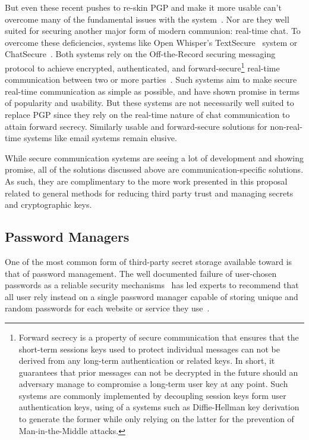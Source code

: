 But even these recent pushes to re-skin PGP and make it more usable
can't overcome many of the fundamental issues with the
system~\cite{green-pgp}. Nor are they well suited for securing another
major form of modern communion: real-time chat. To overcome these
deficiencies, systems like Open Whisper's
TextSecure~\cite{openwhisper} system or
ChatSecure~\cite{chatsecure}. Both systems rely on the Off-the-Record
securing messaging protocol to achieve encrypted, authenticated, and
forward-secure\footnote{Forward secrecy is a property of secure
  communication that ensures that the short-term sessions keys used to
  protect individual messages can not be derived from any long-term
  authentication or related keys. In short, it guarantees that prior
  messages can not be decrypted in the future should an adversary
  manage to compromise a long-term user key at any point. Such systems
  are commonly implemented by decoupling session keys form user
  authentication keys, using of a systems such as Diffie-Hellman key
  derivation~\cite{diffie1976} to generate the former while only
  relying on the latter for the prevention of Man-in-the-Middle
  attacks.} real-time communication between two or more
parties~\cite{otr-v3, borisov2004, goldberg2009}. Such systems aim to
make secure real-time communication as simple as possible, and have
shown promise in terms of popularity and usability. But these systems
are not necessarily well suited to replace PGP since they rely on the
real-time nature of chat communication to attain forward
secrecy. Similarly usable and forward-secure solutions for
non-real-time systems like email systems remain elusive.

While secure communication systems are seeing a lot of development and
showing promise, all of the solutions discussed above are
communication-specific solutions. As such, they are complimentary to
the more work presented in this proposal related to general methods
for reducing third party trust and managing secrets and cryptographic
keys.

\subsection{Password Managers}

One of the most common form of third-party secret storage available
toward is that of password management. The well documented failure of
user-chosen passwords as a reliable security
mechanisms~\cite{goodin-bible, goodin-passwords} has led experts to
recommend that all user rely instead on a single password manager
capable of storing unique and random passwords for each website or
service they use~\cite{schneier-passwords, krebs-passwords,
  brodkin-passman}.

